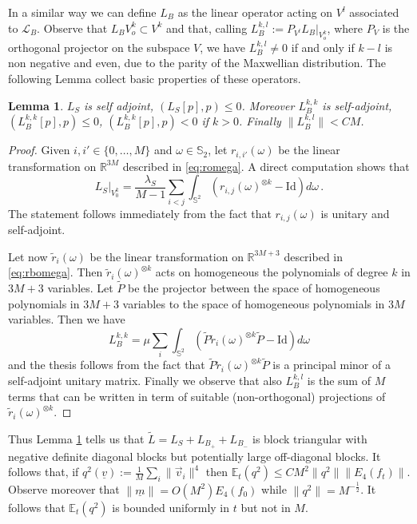 \documentclass{article}
\newcommand*\R{ \mathds{R} }
\newcommand*\EXP{ \mathds{E} }
\newcommand\uv{{\underline v}}
\newcommand\vv{{\vec v}}
\newtheorem{mylemma}[mythm]{Lemma}
\begin{document}
In a similar way we can define $L_{B}$ as the linear operator acting on $V^l$ associated to $\mathcal L_B$. Observe that
$L_{B}V^k_o\subset V^k$ and that, calling $L_B^{k,l}:=P_{V^l}L_B\bigl|_{V^k_o}$, where $P_V$ is the orthogonal projector
on the subspace $V$, we have $L_B^{k,l}\not =0$ if and only if $k-l$ is non negative and even, due to the parity of the
Maxwellian distribution. The following Lemma collect basic properties of these operators.

\begin{mylemma} \label{lem:Lself}
$L_S$ is self adjoint, $(L_S[p],p)\leq 0$. Moreover $L_B^{k,k}$ is self-adjoint, $(L_B^{k,k}[p],p)\leq 0$,
$(L_B^{k,k}[p],p)< 0$ if $k>0$. Finally $\|L_B^{k,l}\|<CM$.
\end{mylemma}
\begin{proof}
Given $i,i'\in \{0,\ldots,M\}$ and $\omega\in \mathds S_2$, let $r_{i,i'}(\omega)$ be the linear transformation on
$\R^{3M}$ described in \eqref{eq:romega}. A direct computation shows that
\[
L_S\bigr|_{V^k_0}=\frac{\lambda_S}{M-1}\sum_{i<j} \int_{\mathds S^2}( r_{i,j}(\omega)^{\otimes k}-\mathrm{Id})d\omega\, 
.
\]
The statement follows immediately from the fact that $r_{i,j}(\omega)$ is unitary and self-adjoint.

Let now $\tilde r_i(\omega)$ be the linear transformation on $\R^{3M+3}$ described in \eqref{eq:rbomega}. Then $\tilde 
r_i(\omega)^{\otimes k}$ acts on homogeneous the polynomials of degree $k$ in $3M+3$ variables. Let $\widetilde P$ be 
the projector between the space of homogeneous polynomials in $3M+3$ variables to the space of homogeneous polynomials 
in $3M$ variables. Then we have
\[
L_B^{k,k}=\mu \sum_i \int_{\mathds S^2}( \widetilde P\tilde r_{i}(\omega)^{\otimes k}\widetilde P-\mathrm{Id})d\omega
\] 
and the thesis follows from the fact that $\widetilde P\tilde r_{i}(\omega)^{\otimes k}\widetilde P$ is a principal
minor of a self-adjoint unitary matrix. Finally we observe that also $L_B^{k,l}$ is the sum of $M$ terms that can be
written in term of suitable (non-orthogonal) projections of $\tilde r_{i}(\omega)^{\otimes k}$.
\end{proof}

Thus Lemma \ref{lem:Lself} tells us that $\widetilde L= L_S +  L_{B_+} +  L_{B_-}$ is block triangular with negative
definite diagonal blocks but potentially large off-diagonal blocks. It follows that, if $q^2(\uv):=\frac{1}{M}\sum_i
\|\vv_i\|^{4}$ then $\EXP_t(q^2)\leq CM^{2}\|q^2\|\|E_4(f_t)\|$. Observe moreover that $\|\underline m\|=O(M^2) E_4(f_0)$
while $\|q^2\|=M^{-\frac 12}$. It follows that $\EXP_t(q^2)$ is bounded uniformly in $t$ but not in $M$.
\end{document}
